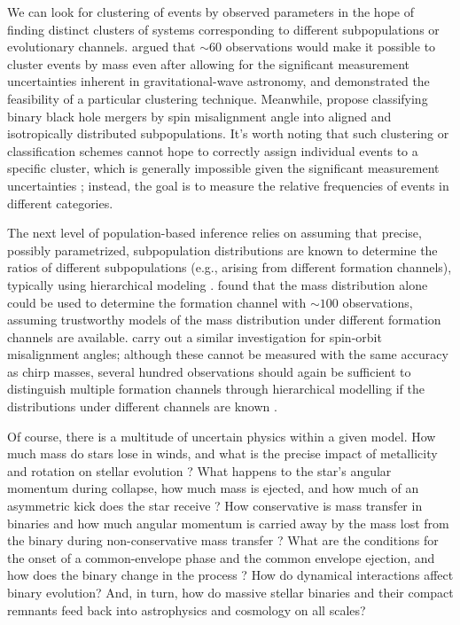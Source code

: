 \documentclass[iop,onecolumn]{revtex4}
\begin{document}
We can look for clustering of events by observed parameters in the hope of finding distinct clusters of systems corresponding to different subpopulations or evolutionary channels.  \citet{Mandel:2015} argued that $\sim 60$ observations would make it possible to cluster events by mass even after allowing for the significant measurement uncertainties inherent in gravitational-wave astronomy, and \citet{Mandel:2016cluster} demonstrated the feasibility of a particular clustering technique.  Meanwhile, \citet{Farr:2018} propose classifying binary black hole mergers by spin misalignment angle into aligned and isotropically distributed subpopulations.  It's worth noting that such clustering or classification schemes cannot hope to correctly assign individual events to a specific cluster, which is generally impossible given the significant measurement uncertainties \citep{Littenberg:2015}; instead, the goal is to measure the relative frequencies of events in different categories.

The next level of population-based inference relies on assuming that precise, possibly parametrized, subpopulation distributions are known to determine the ratios of different subpopulations (e.g., arising from different formation channels), typically using hierarchical modeling \citep[extreme deconvolution in the language of][]{Hogg:2010}.  \citet{Zevin:2017} found that the mass distribution alone could be used to determine the formation channel with $\sim 100$ observations, assuming trustworthy models of the mass distribution under different formation channels are available.  \citet{Vitale:2015,Stevenson:2017spin} carry out a similar investigation for spin-orbit misalignment angles; although these cannot be measured with the same accuracy as chirp masses, several hundred observations should again be sufficient to distinguish multiple formation channels through hierarchical modelling if the distributions under different channels are known \citep{Stevenson:2017spin}.   

Of course, there is a multitude of uncertain physics within a given model.  How much mass do stars lose in winds, and what is the precise impact of metallicity and rotation on stellar evolution \citep[e.g.,][]{Renzo:2017}?  What happens to the star's angular momentum during collapse, how much mass is ejected, and how much of an asymmetric kick does the star receive \citep[e.g.,][]{Mirabel:2016}? How conservative is mass transfer in binaries and how much angular momentum is carried away by the mass lost from the binary during non-conservative mass transfer \citep[e.g.,][]{vandenHeuvel:2017}?  What are the conditions for the onset of a common-envelope phase and the common envelope ejection, and how does the binary change in the process \citep[e.g.,][]{Ivanova:2013}?   How do dynamical interactions affect binary evolution?  And, in turn, how do massive stellar binaries and their compact remnants feed back into astrophysics and cosmology on all scales?
\end{document}
